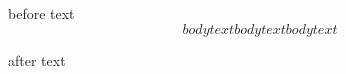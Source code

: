 \begin{surround}
	before text
	\[
    body text
      body text
body text
  \]

	after text
\end{surround}
